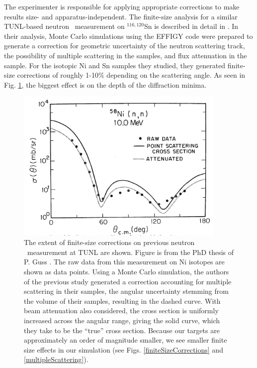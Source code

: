 The experimenter is responsible
for applying appropriate corrections to make results size- and
apparatus-independent. The finite-size analysis for
a similar TUNL-based neutron \el\ measurement on $^{116,120}$Sn is described in detail
in \cite{GussPhDThesis}. In their analysis, Monte Carlo simulations using the
EFFIGY code were
prepared to generate a correction for geometric uncertainty of the neutron
scattering track, the possibility of multiple scattering
in the samples, and flux attenuation in the sample.
For the isotopic Ni and Sn samples they studied, they generated finite-size
corrections of roughly 1-10\% depending on the scattering angle. As seen in
Fig. \ref{GussFiniteSizeEffect}, the
biggest effect is on the depth of the diffraction minima.
\begin{figure}[tb]
    \centering
    \includegraphics[width=0.9\textwidth, trim={0 0.1cm 0 0}, clip]{figures/GussFiniteSizeEffect.png}
    \caption[Effect of finite-size corrections on previous neutron \el\ measurement at
    TUNL]
    {
        The extent of finite-size corrections on previous neutron \el\ measurement at
        TUNL are shown. Figure is from the PhD thesis of P. Guss \cite{GussPhDThesis}.
        The raw data from this measurement on Ni isotopes are shown as data
        points. Using a Monte Carlo simulation, the authors of the previous
        study generated a correction accounting for multiple scattering in
        their samples, the angular uncertainty stemming from the volume
        of their samples, resulting in the dashed curve. With beam
        attenuation also considered, the cross section is uniformly
        increased across the angular range, giving the solid curve, which
        they take to be the ``true'' cross section. Because our targets are
        approximately an order of magnitude smaller, we see smaller
        finite size effects in our simulation (see Figs.
        \ref{finiteSizeCorrections} and \ref{multipleScattering}).
    }
    \label{GussFiniteSizeEffect}
\end{figure}

